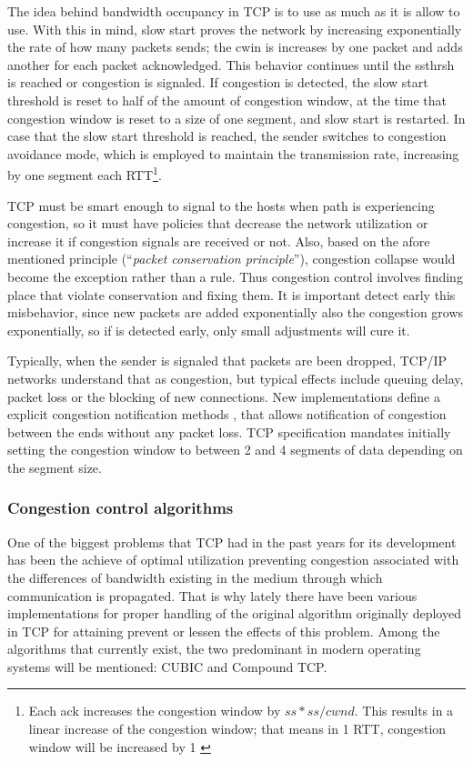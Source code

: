 The idea behind bandwidth occupancy in TCP is to use as much as it is allow to
use. With this in mind, slow start proves the network by increasing
exponentially the rate of how many packets sends; the \gls{cwin} is
increases by one packet and adds another for each packet acknowledged. This
behavior continues until the \gls{ssthrsh} is reached or
congestion is signaled. If congestion is detected, the slow start threshold is
reset to half of the amount of congestion window, at the time that congestion
window is reset to a size of one segment, and slow start is restarted. In case
that the slow start threshold is reached, the sender switches to congestion
avoidance mode, which is employed to maintain the transmission rate,
increasing by one segment each RTT\footnote{Each ack increases the congestion
window by $ss*ss/cwnd$. This results in a linear increase of the congestion
window; that means in 1 RTT, congestion window will be increased by
1 \cite{JacobsonCAC} \cite{rfc879} \cite{rfc2460}}.

TCP must be smart enough to signal to the hosts when path is experiencing
congestion, so it must have policies that decrease the network utilization or
increase it if congestion signals are received or not. Also, based on the
afore mentioned principle (``\textit{packet conservation principle}''),
congestion collapse would become the exception rather than a rule. Thus
congestion control involves finding place that violate conservation and fixing
them. It is important detect early this misbehavior, since new packets are
added exponentially also the congestion grows exponentially, so if is detected
early, only small adjustments will cure it.

Typically, when the sender is signaled that packets are been dropped, TCP/IP
networks understand that as congestion, but typical effects include queuing
delay, packet loss or the blocking of new connections. New implementations
define a explicit congestion notification methods \cite{rfc3168}, that allows
notification of congestion between the ends without any packet loss. TCP
specification mandates initially setting the congestion window to between 2
and 4 segments of data depending on the segment size\cite{rfc3390}.

\subsubsection{Congestion control algorithms}
One of the biggest problems that TCP had in the past years for its development
has been the achieve of optimal utilization preventing congestion associated
with the differences of bandwidth existing in the medium through which
communication is propagated. That is why lately there have been various
implementations for proper handling of the original algorithm originally
deployed in TCP for attaining prevent or lessen the effects of this problem.
Among the algorithms that currently exist, the two predominant in modern
operating systems will be mentioned: CUBIC and Compound TCP.

